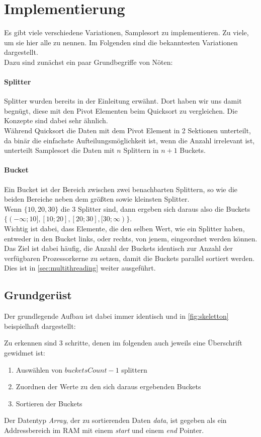 \section{Implementierung}
	Es gibt viele verschiedene Variationen, Samplesort zu implementieren. Zu viele, um sie hier alle zu nennen.
	Im Folgenden sind die bekanntesten Variationen dargestellt.\\
	Dazu sind zunächst ein paar Grundbegriffe von Nöten:
	\paragraph{Splitter}
		Splitter wurden bereits in der Einleitung erwähnt.
		Dort haben wir uns damit begnügt, diese mit den Pivot Elementen beim Quicksort zu vergleichen.
		Die Konzepte sind dabei sehr ähnlich.\\
		Während Quicksort die Daten mit dem Pivot Element in 2 Sektionen unterteilt, da binär die einfachste Aufteilungsmöglichkeit ist, wenn die Anzahl irrelevant ist, unterteilt Samplesort die Daten mit $n$ Splittern in $n+1$ Buckets.
	\paragraph{Bucket}
		Ein Bucket ist der Bereich zwischen zwei benachbarten Splittern, so wie die beiden Bereiche neben dem größten sowie kleinsten Splitter.\\
		Wenn $\{10, 20, 30\}$ die 3 Splitter sind, dann ergeben sich daraus also die Buckets $\{(-\infty;10],\allowbreak [10;20],\allowbreak [20;30],\allowbreak [30;\infty)\}$.\\
		Wichtig ist dabei, dass Elemente, die den selben Wert, wie ein Splitter haben, entweder in den Bucket links, oder rechts, von jenem, eingeordnet werden können.\\
		Das Ziel ist dabei häufig, die Anzahl der Buckets identisch zur Anzahl der verfügbaren Prozessorkerne zu setzen, damit die Buckets parallel sortiert werden. Dies ist in \ref{sec:multithreading} weiter ausgeführt.

	\subsection{Grundger\"ust}
		Der grundlegende Aufbau ist dabei immer identisch und in \ref{fig:skeletton} beispielhaft dargestellt:
		
		Zu erkennen sind 3 schritte, denen im folgenden auch jeweils eine Überschrift gewidmet ist:
		\begin{enumerate}
			\item Auswählen von $\textit{bucketsCount}-1$ splittern
			\item Zuordnen der Werte zu den sich daraus ergebenden Buckets
			\item Sortieren der Buckets
		\end{enumerate}
		Der Datentyp \textit{Array}, der zu sortierenden Daten \textit{data}, ist gegeben als ein Addressbereich im RAM mit einem \textit{start} und einem \textit{end} Pointer.

